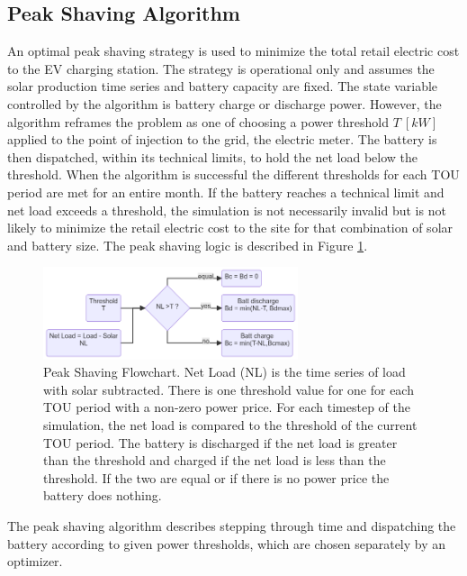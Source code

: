 \documentclass[journal,article,submit,pdftex,moreauthors]{Definitions/mdpi}
\begin{document}
\subsection{Peak Shaving Algorithm}\label{peak-shaving-algorithm}%

An optimal peak shaving strategy is used to minimize the total retail electric cost to the EV charging station. The strategy is operational only and assumes the solar production time series and battery capacity are fixed. The state variable controlled by the algorithm is battery charge or discharge power. However, the algorithm reframes the problem as one of choosing a power threshold \(T\ [kW]\) applied to the point of injection to the grid, the electric meter. The battery is then dispatched, within its technical limits, to hold the net load below the threshold. When the algorithm is successful the different thresholds for each TOU period are met for an entire month. If the battery reaches a technical limit and net load exceeds a threshold, the simulation is not necessarily invalid but is not likely to minimize the retail electric cost to the site for that combination of solar and battery size. The peak shaving logic is described in Figure \ref{fig:peakshaving-flowchart}.

\begin{figure}
  \centering
  \includegraphics[width=7.5cm]{./images/peak shaving flowchart.png}
  \caption{Peak Shaving Flowchart. Net Load (NL) is the time series of load with solar subtracted. There is one threshold value for one for each TOU period with a non-zero power price. For each timestep of the simulation, the net load is compared to the threshold of the current TOU period. The battery is discharged if the net load is greater than the threshold and charged if the net load is less than the threshold. If the two are equal or if there is no power price the battery does nothing.}
  \label{fig:peakshaving-flowchart}
\end{figure}

The peak shaving algorithm describes stepping through time and dispatching the battery according to given power thresholds, which are chosen separately by an optimizer.
\end{document}

